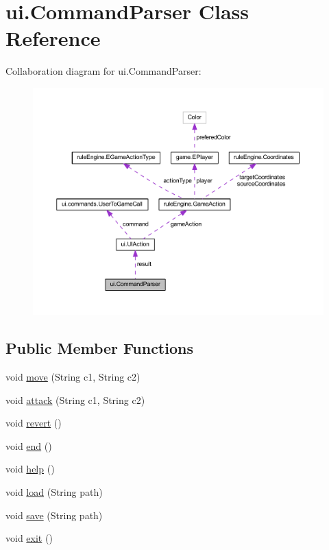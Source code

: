 \hypertarget{classui_1_1_command_parser}{}\section{ui.\+Command\+Parser Class Reference}
\label{classui_1_1_command_parser}


Collaboration diagram for ui.\+Command\+Parser\+:
\nopagebreak
\begin{figure}[H]
\begin{center}
\leavevmode
\includegraphics[width=350pt]{classui_1_1_command_parser__coll__graph}
\end{center}
\end{figure}
\subsection*{Public Member Functions}
\begin{DoxyCompactItemize}
\item 
void \mbox{\hyperlink{classui_1_1_command_parser_a93c89e96a15062847ba74d20d21075e1}{move}} (String c1, String c2)
\item 
void \mbox{\hyperlink{classui_1_1_command_parser_a84493d28cdfdab457eec5bfeebaf7350}{attack}} (String c1, String c2)
\item 
void \mbox{\hyperlink{classui_1_1_command_parser_a77911ad72c45c288bdf7a3c7c096ab07}{revert}} ()
\item 
void \mbox{\hyperlink{classui_1_1_command_parser_ac54bd859c6cda6b5b98fc61fa02c9b38}{end}} ()
\item 
void \mbox{\hyperlink{classui_1_1_command_parser_a1c3d942af54e4146cd87c11cbdb4a626}{help}} ()
\item 
void \mbox{\hyperlink{classui_1_1_command_parser_a2d11a803c2f103352b347cbc00cf49a9}{load}} (String path)
\item 
void \mbox{\hyperlink{classui_1_1_command_parser_a72ac4304e38b2ac30f642388d6fe6bff}{save}} (String path)
\item 
void \mbox{\hyperlink{classui_1_1_command_parser_af0cb86f130ca5454cec4792d6c795416}{exit}} ()
\end{DoxyCompactItemize}
